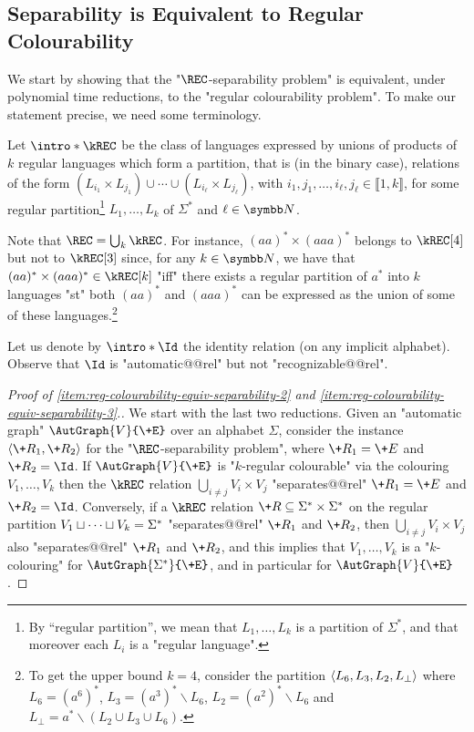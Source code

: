 \subsection{Separability is Equivalent to Regular Colourability}

We start by showing that the "$\REC$-separability problem" is equivalent,
under polynomial time reductions, to the "regular colourability problem". To make our statement precise, we need some terminology.

\AP Let $\intro*\kREC$ be the class of languages expressed by unions of products of $k$ regular languages which form a partition, that is (in the binary case), relations of the form $(L_{i_1} \times L_{j_1}) \cup \dotsb \cup (L_{i_\ell} \times L_{j_\ell})$, with $i_1,j_1,\hdots,i_\ell, j_\ell \in \lBrack 1,k \rBrack$, for some regular partition\footnote{By ``regular partition'',
we mean that $L_1, \dotsc, L_{k}$ is a partition of $\Sigma^*$, and that moreover
each $L_i$ is a "regular language".} $L_1, \dotsc, L_{k}$ of $\Sigma^*$ and $\ell \in \N$.

Note that $\REC = \bigcup_k \kREC$.
For instance, $(aa)^* \times (aaa)^*$ belongs to $\kREC[4]$ but not to $\kREC[3]$
since, for any $k\in \N$, we have that $(aa)^* \times (aaa)^* \in \kREC[k]$ "iff"
there exists a regular partition of $a^*$ into $k$ languages "st" both
$(aa)^*$ and $(aaa)^*$ can be expressed as the union of some of these languages.\footnote{To get the
upper bound $k=4$, consider the partition $\langle L_6, L_3, L_2, L_\bot\rangle$ where $L_6 = (a^6)^*$,
$L_3 = (a^3)^* \smallsetminus L_6$, $L_2 = (a^2)^* \smallsetminus L_6$ and $L_\bot = a^* \smallsetminus (L_2 \cup L_3 \cup L_6)$.}

\AP Let us denote by $\intro*\Id$ the identity relation (on any implicit alphabet). Observe that $\Id$ is "automatic@@rel" but not "recognizable@@rel".

\regcolourabilityequivseparability%
   
\begin{proof}[Proof of \eqref{item:reg-colourability-equiv-separability-2} and
    \eqref{item:reg-colourability-equiv-separability-3}.]
    We start with the last two reductions.
    Given an "automatic graph" $\AutGraph{V}{\+E}$ over an alphabet $\Sigma$, consider the instance
    $\tup{\+R_1, \+R_2}$ for the "$\REC$-separability problem", where 
    $\+R_1 = \+E$ and $\+R_2 = \Id$. 
    If $\AutGraph{V}{\+E}$ is "$k$-regular colourable" via the colouring $V_1, \dotsc, V_k$ then the $\kREC$ relation
    $\bigcup_{i \neq j} V_i \times V_j$ "separates@@rel" $\+R_1 = \+E$ and $\+R_2 = \Id$. 
    Conversely, if a $\kREC$ relation $\+R \subseteq \Sigma^* \times \Sigma^*$ on the regular 
    partition $V_1 \sqcup \dotsb \sqcup V_k = \Sigma^*$ "separates@@rel" $\+R_1$ and $\+R_2$, then $\bigcup_{i \neq j} V_i \times V_j$ also "separates@@rel" $\+R_1$ and $\+R_2$, and this implies that $V_1, \dotsc, V_k$ is a "$k$-colouring" for $\AutGraph{\Sigma^*}{\+E}$, and in particular
    for $\AutGraph{V}{\+E}$.
\end{proof}

